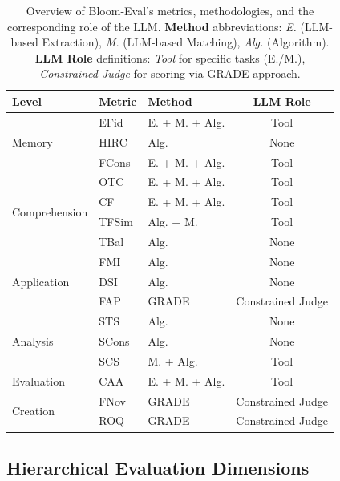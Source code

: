 \documentclass[11pt]{article}
\begin{document}
\begin{table}[h!]
\centering
\caption{Overview of Bloom-Eval's metrics, methodologies, and the corresponding role of the LLM.
\textbf{Method} abbreviations: 
\textit{E.} (LLM-based Extraction), 
\textit{M.} (LLM-based Matching), 
\textit{Alg.} (Algorithm). 
\textbf{LLM Role} definitions: 
\textit{Tool} for specific tasks (E./M.), 
\textit{Constrained Judge} for scoring via GRADE approach.}
\label{tab:metric_overview}

\footnotesize             
\setlength{\tabcolsep}{2pt}  %
\renewcommand{\arraystretch}{1} %

\begin{tabularx}{\columnwidth}{l l l c} 
\toprule
\textbf{Level} & \textbf{Metric} & \textbf{Method} & \textbf{LLM Role} \\ 
\midrule
\multirow{3}{*}{Memory} & EFid & E. + M. + Alg. &   Tool \\
 & HIRC & Alg. & None \\
 & FCons & E. + M. + Alg. & Tool \\
\midrule
\multirow{4}{*}{Comprehension} & OTC & E. + M. + Alg. & Tool \\
 & CF & E. + M. + Alg. & Tool \\
 & TFSim & Alg. + M. & Tool \\
 & TBal & Alg. & None \\
\midrule
\multirow{3}{*}{Application} & FMI & Alg. & None \\
 & DSI & Alg. & None \\
 & FAP & GRADE & Constrained Judge \\
\midrule
\multirow{3}{*}{Analysis} & STS & Alg. & None \\
 & SCons & Alg. & None \\
 & SCS & M. + Alg. & Tool \\
\midrule
Evaluation & CAA & E. + M. + Alg. & Tool \\
\midrule
\multirow{2}{*}{Creation} & FNov & GRADE & Constrained Judge \\
 & ROQ & GRADE & Constrained Judge \\
\bottomrule
\end{tabularx}
\end{table}

\subsection{Hierarchical Evaluation Dimensions}
\label{sec:dimensions}
\end{document}
